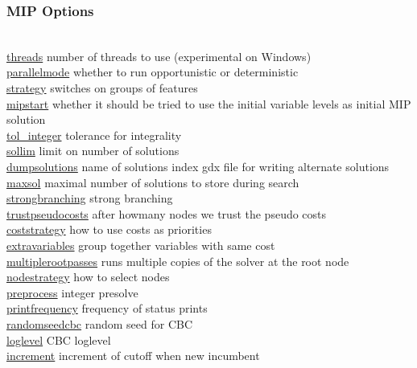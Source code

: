 \subsubsection{MIP Options}
\begin{tabbing}
\hspace {1.3in} \= \\
\hyperlink{threads}
{threads} \> number of threads to use (experimental on Windows) \\
\hyperlink{parallelmode}
{parallelmode} \> whether to run opportunistic or deterministic \\
\hyperlink{strategy}
{strategy} \> switches on groups of features \\
\hyperlink{mipstart}
{mipstart} \> whether it should be tried to use the initial variable levels as initial MIP solution \\
\hyperlink{tol_integer}
{tol\_integer} \> tolerance for integrality \\
\hyperlink{sollim}
{sollim} \> limit on number of solutions \\
\hyperlink{dumpsolutions}
{dumpsolutions} \> name of solutions index gdx file for writing alternate solutions \\
\hyperlink{maxsol}
{maxsol} \> maximal number of solutions to store during search \\
\hyperlink{strongbranching}
{strongbranching} \> strong branching \\
\hyperlink{trustpseudocosts}
{trustpseudocosts} \> after howmany nodes we trust the pseudo costs \\
\hyperlink{coststrategy}
{coststrategy} \> how to use costs as priorities \\
\hyperlink{extravariables}
{extravariables} \> group together variables with same cost \\
\hyperlink{multiplerootpasses}
{multiplerootpasses} \> runs multiple copies of the solver at the root node \\
\hyperlink{nodestrategy}
{nodestrategy} \> how to select nodes \\
\hyperlink{preprocess}
{preprocess} \> integer presolve \\
\hyperlink{printfrequency}
{printfrequency} \> frequency of status prints \\
\hyperlink{randomseedcbc}
{randomseedcbc} \> random seed for CBC \\
\hyperlink{loglevel}
{loglevel} \> CBC loglevel \\
\hyperlink{increment}
{increment} \> increment of cutoff when new incumbent \\

\end{tabbing}

